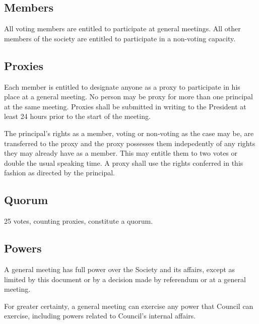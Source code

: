\subsection{Members}
All voting members are entitled to participate at general meetings. All other
members of the society are entitled to participate in a non-voting capacity.

\subsection{Proxies}
Each member is entitled to designate anyone as a proxy to participate in his
place at a general meeting. No person may be proxy for more than one principal
at the same meeting. Proxies shall be submitted in writing to the President at
least 24 hours prior to the start of the meeting.

The principal's rights as a member, voting or non-voting as the case may be, are
transferred to the proxy and the proxy possesses them indepedently of any rights
they may already have as a member. This may entitle them to two votes or double
the usual speaking time. A proxy shall use the rights conferred in this fashion
as directed by the principal.

\subsection{Quorum}
25 votes, counting proxies, constitute a quorum.

\subsection{Powers}
A general meeting has full power over the Society and its affairs, except as
limited by this document or by a decision made by referendum or at a general
meeting.

For greater certainty, a general meeting can exercise any power that Council
can exercise, including powers related to Council's internal affairs.
